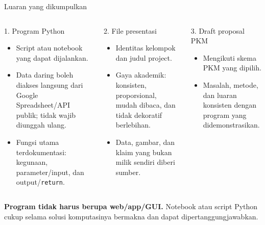 \documentclass[aspectratio=169,11pt]{beamer}
\begin{document}
\begin{frame}{Luaran yang dikumpulkan}
\begin{columns}[T]
\begin{block}{1. Program Python}
\footnotesize
\begin{itemize}
  \item Script atau notebook yang dapat dijalankan.
  \item Data daring boleh diakses langsung dari Google Spreadsheet/API publik; tidak wajib diunggah ulang.
  \item Fungsi utama terdokumentasi: kegunaan, parameter/input, dan output/\texttt{return}.
\end{itemize}
\end{block}
\begin{block}{2. File presentasi}
\footnotesize
\begin{itemize}
  \item Identitas kelompok dan judul project.
  \item Gaya akademik: konsisten, proporsional, mudah dibaca, dan tidak dekoratif berlebihan.
  \item Data, gambar, dan klaim yang bukan milik sendiri diberi sumber.
\end{itemize}
\end{block}
\begin{block}{3. Draft proposal PKM}
\footnotesize
\begin{itemize}
  \item Mengikuti skema PKM yang dipilih.
  \item Masalah, metode, dan luaran konsisten dengan program yang didemonstrasikan.
\end{itemize}
\end{block}
\end{columns}
\vspace{1mm}
\centering\footnotesize\textbf{Program tidak harus berupa web/app/GUI.} Notebook atau script Python cukup selama solusi komputasinya bermakna dan dapat dipertanggungjawabkan.
\end{frame}
\end{document}
